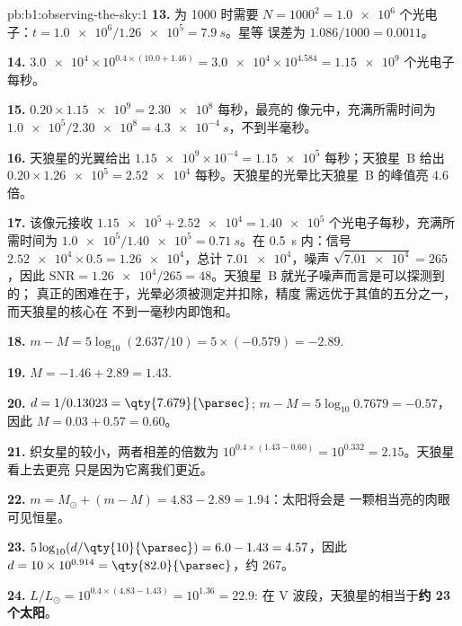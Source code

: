 \begin{solution}{pb:b1:observing-the-sky:1}
\textbf{13.} 为 1000 时需要 $N = 1000^2 = \num{1.0e6}$
个光电子：$t = \num{1.0e6}/\num{1.26e5} = \qty{7.9}{s}$。星等
误差为 $1.086/1000 = \num{0.0011}$。

\textbf{14.} $\num{3.0e4}\times10^{0.4\times(10.0 + 1.46)} = \num{3.0e4}
\times10^{4.584} = \num{1.15e9}$ 个光电子每秒。

\textbf{15.} $0.20\times\num{1.15e9} = \num{2.30e8}$ 每秒，最亮的
像元中，充满所需时间为 $\num{1.0e5}/\num{2.30e8} =
\qty{4.3e-4}{s}$，不到半毫秒。

\textbf{16.} 天狼星的光翼给出 $\num{1.15e9}\times10^{-4} =
\num{1.15e5}$ 每秒；天狼星~B 给出 $0.20\times\num{1.26e5} =
\num{2.52e4}$ 每秒。天狼星的光晕比天狼星~B 的峰值亮
4.6 倍。

\textbf{17.} 该像元接收 $\num{1.15e5} + \num{2.52e4} = \num{1.40e5}$
个光电子每秒，充满所需时间为 $\num{1.0e5}/\num{1.40e5} = \qty{0.71}{s}$。在
\qty{0.5}{s} 内：信号 $\num{2.52e4}\times0.5 = \num{1.26e4}$，总计
$\num{7.01e4}$，噪声 $\sqrt{\num{7.01e4}} = 265$，因此 $\mathrm{SNR} =
\num{1.26e4}/265 = 48$。天狼星~B 就光子噪声而言是可以探测到的；
真正的困难在于，光晕必须被测定并扣除，精度
需远优于其值的五分之一，而天狼星的核心在
不到一毫秒内即饱和。

\textbf{18.} $m - M = 5\log_{10}(2.637/10) = 5\times(-0.579) = -2.89$.

\textbf{19.} $M = -1.46 + 2.89 = 1.43$.

\textbf{20.} $d = 1/0.13023 = \qty{7.679}{\parsec}$;
$m - M = 5\log_{10}0.7679 = -0.57$，因此 $M = 0.03 + 0.57 = 0.60$。

\textbf{21.} 织女星的较小，两者相差的倍数为
$10^{0.4\times(1.43 - 0.60)} = 10^{0.332} = 2.15$。天狼星看上去更亮
只是因为它离我们更近。

\textbf{22.} $m = M_\odot + (m - M) = 4.83 - 2.89 = 1.94$：太阳将会是
一颗相当亮的肉眼可见恒星。

\textbf{23.} $5\log_{10}(d/\qty{10}{\parsec}) = 6.0 - 1.43 = 4.57$，因此
$d = 10\times10^{0.914} = \qty{82.0}{\parsec}$，约 \qty{267}{\lightyear}。

\textbf{24.} $L/L_\odot = 10^{0.4\times(4.83 - 1.43)} = 10^{1.36} = 22.9$:
在 V 波段，天狼星的相当于\textbf{约 23 个太阳}。
\end{solution}

